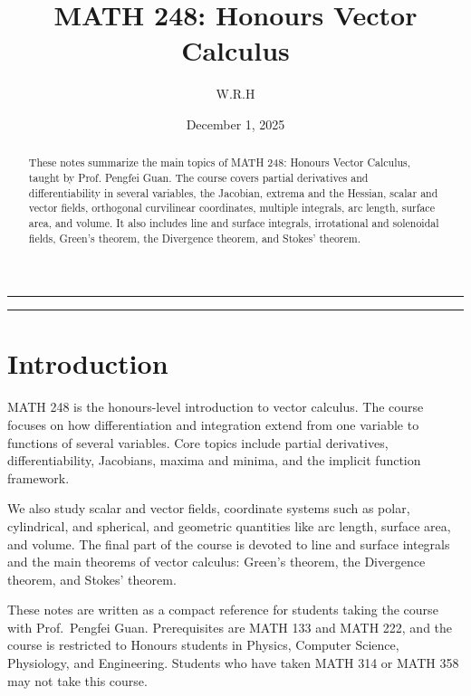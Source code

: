 \documentclass{article}
\begin{document}
\title{MATH 248: Honours Vector Calculus}
\author{W.R.H}
\date{December 1, 2025}
\setcounter{Maxaffil}{0}
\renewcommand\Affilfont{\itshape\small}
\maketitle

\noindent\rule{\textwidth}{0.4pt}
\thispagestyle{empty}
\begin{abstract}
    These notes summarize the main topics of MATH 248: Honours Vector Calculus, taught by Prof. Pengfei Guan. The course covers partial derivatives and differentiability in several variables, the Jacobian, extrema and the Hessian, scalar and vector fields, orthogonal curvilinear coordinates, multiple integrals, arc length, surface area, and volume. It also includes line and surface integrals, irrotational and solenoidal fields, Green's theorem, the Divergence theorem, and Stokes' theorem.
\end{abstract}
\noindent\rule{\textwidth}{0.4pt}
\clearpage

\thispagestyle{empty}
\hypersetup{
    citecolor=black,
    filecolor=black,
    linkcolor=black,
    urlcolor=black
}
\tableofcontents
\clearpage

\setcounter{page}{1}
\section{Introduction}

MATH 248 is the honours-level introduction to vector calculus. The course focuses on how differentiation and integration extend from one variable to functions of several variables. Core topics include partial derivatives, differentiability, Jacobians, maxima and minima, and the implicit function framework. 

We also study scalar and vector fields, coordinate systems such as polar, cylindrical, and spherical, and geometric quantities like arc length, surface area, and volume. The final part of the course is devoted to line and surface integrals and the main theorems of vector calculus: Green's theorem, the Divergence theorem, and Stokes' theorem.

These notes are written as a compact reference for students taking the course with Prof.~Pengfei Guan. Prerequisites are MATH 133 and MATH 222, and the course is restricted to Honours students in Physics, Computer Science, Physiology, and Engineering. Students who have taken MATH 314 or MATH 358 may not take this course.
\end{document}
